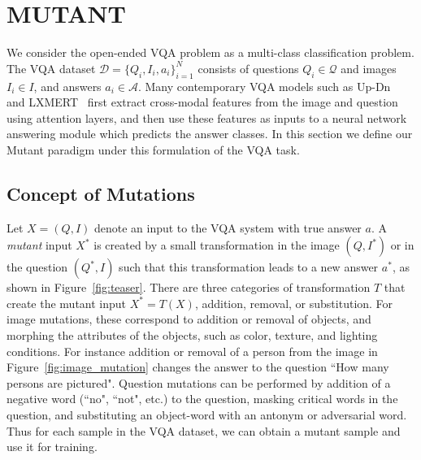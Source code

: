 

\section{MUTANT}
We consider the open-ended VQA problem as a multi-class classification problem.
The VQA dataset $\mathcal{D} = \{Q_i, I_i, a_i\}_{i=1}^N$ consists of questions $Q_i \in \mathcal{Q}$ and images $I_i \in {I}$, and answers $a_i \in \mathcal{A}$.
Many contemporary VQA models such as Up-Dn~\citep{anderson2018bottom} and LXMERT~\citep{tan2019lxmert} first extract cross-modal features from the image and question using attention layers, and then use these features as inputs to a neural network answering module which predicts the answer classes.
In this section we define our Mutant paradigm under this formulation of the VQA task.

    \subsection{Concept of Mutations}
    Let $X = (Q, I)$ denote an input to the VQA system with true answer $a$.
    A \textit{mutant} input $X^*$ is created by a small transformation in the image $(Q, I^*)$ or in the question $(Q^*, I)$ such that this transformation leads to a new answer $a^*$, as shown in Figure~\ref{fig:teaser}.
    There are three categories of transformation $T$ that create the mutant input $X^* = T(X)$, addition, removal, or substitution. 
    For image mutations, these correspond to addition or removal of objects, and morphing the attributes of the objects, such as color, texture, and lighting conditions. 
    For instance addition or removal of a person from the image in Figure~\ref{fig:image_mutation} changes the answer to the question ``How many persons are pictured".
    Question mutations can be performed by addition of a negative word (``no", ``not", etc.) to the question, masking critical words in the question, and substituting an object-word with an antonym or adversarial word.
    Thus for each sample in the VQA dataset, we can obtain a mutant sample and use it for training.

